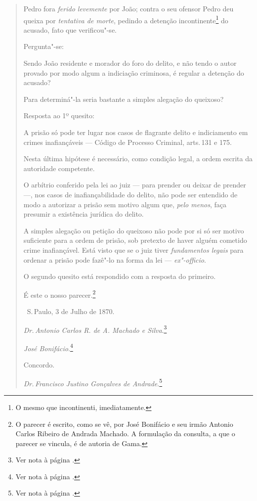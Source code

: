 \begin{quote}
Pedro fora \emph{ferido levemente} por João; contra o seu ofensor Pedro
deu queixa por \emph{tentativa de morte}, pedindo a detenção
incontinente\footnote{O mesmo que incontinenti, imediatamente.} do
acusado, fato que verificou"-se.

Pergunta"-se:

Sendo João residente e morador do foro do delito, e não tendo o autor
provado por modo algum a indiciação criminosa, é regular a detenção do
acusado?

Para determiná"-la seria bastante a simples alegação do queixoso?

Resposta ao 1º quesito:

A prisão só pode ter lugar nos casos de flagrante delito e indiciamento
em crimes inafiançáveis --- Código de Processo Criminal, arts.\,131 e
175.

Nesta última hipótese é necessário, como condição legal, a ordem escrita
da autoridade competente.

O arbítrio conferido pela lei ao juiz --- para prender ou deixar de
prender ---, nos casos de inafiançabilidade do delito, não pode ser
entendido de modo a autorizar a prisão sem motivo algum que, \emph{pelo
menos}, faça presumir a existência jurídica do delito.

A simples alegação ou petição do queixoso não pode por si só ser motivo
suficiente para a ordem de prisão, sob pretexto de haver alguém cometido
crime inafiançável. Está visto que se o juiz tiver \emph{fundamentos
legais} para ordenar a prisão pode fazê"-lo na forma da lei ---
\emph{ex"-officio}.

O segundo quesito está respondido com a resposta do primeiro.

É este o nosso parecer.\footnote{O parecer é escrito, como se vê, por
  José Bonifácio e seu irmão Antonio Carlos Ribeiro de Andrada Machado.
  A formulação da consulta, a que o parecer se vincula, é de autoria de
  Gama.}

\medskip

\hfill\ S.\,Paulo, 3 de Julho de 1870.\smallskip

\hfill\emph{Dr.\,Antonio Carlos R. de A. Machado e Silva}.\footnote{Ver nota à página \pageref{machado}.}

\hfill\emph{José Bonifácio}.\footnote{Ver nota à página \pageref{bonifacio}.}\bigskip

Concordo.

\qquad\emph{Dr.\,Francisco Justino Gonçalves de Andrade}.\footnote{Ver nota à página \pageref{justino}.}\bigskip


\end{quote}
